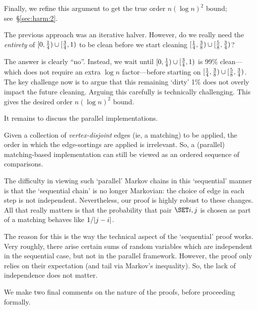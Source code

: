 \documentclass{article}
\begin{document}
Finally, we refine this argument to get the true order $n (\log n)^2$ bound;
see~\S\ref{sec:harm:2}.

\begin{Proof}
\qedtriangle
The previous approach was an iterative halver.
However, do we really need the \emph{entirety} of $[0, \tfrac14) \cup [\tfrac34, 1)$ to be clean before we start cleaning $[\tfrac14, \tfrac38) \cup [\tfrac58, \tfrac34)$?

The answer is clearly ``no''.
Instead, we  wait until $[0, \tfrac14) \cup [\tfrac34, 1)$ is 99\% clean---which does not require an extra $\log n$ factor---before starting on $[\tfrac14, \tfrac38) \cup [\tfrac58, \tfrac34)$.
The key challenge now is to argue that this remaining `dirty' 1\%
does not overly impact the future cleaning.
Arguing this carefully is technically challenging.
This gives the desired order $n (\log n)^2$ bound.
\end{Proof}

It remains to discuss the parallel implementations.

\begin{Proof}
\qedtriangle
Given a collection of \emph{vertex-disjoint} edges (ie, a matching) to be applied, the order in which the edge-sortings are applied is irrelevant.
So, a (parallel) matching-based implementation can still be viewed as an ordered sequence of comparisons.

The difficulty in viewing such `parallel' Markov chains in this `sequential' manner is that the `sequential chain' is no longer Markovian: the choice of edge in each step is not independent.
Nevertheless, our proof is highly robust to these changes.
All that really matters is that the probability that pair $\set{i,j}$ is chosen as part of a matching behaves like $1/| j - i |$.

The reason for this is the way the technical aspect of the `sequential' proof works.
Very roughly, there arise certain sums of random variables which are independent in the sequential case, but not in the parallel framework.
However, the proof only relies on their expectation (and tail via Markov's inequality).
So, the lack of independence does not matter.
\end{Proof}

We make two final comments on the nature of the proofs, before proceeding formally.
\end{document}

